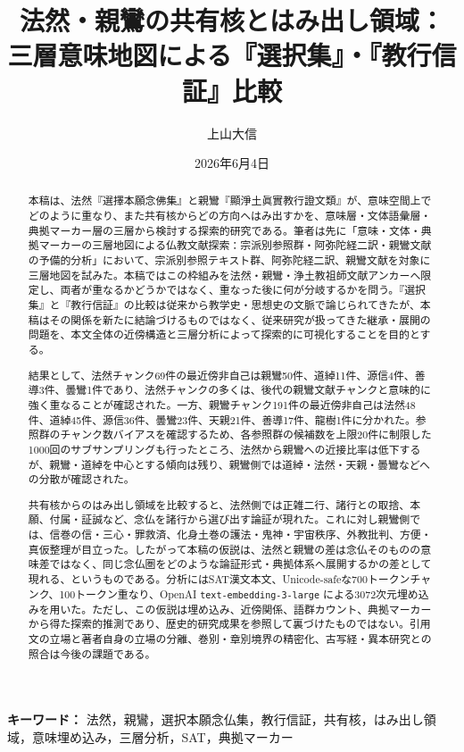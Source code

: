 \documentclass[uplatex,dvipdfmx,11pt,a4paper]{jsarticle}
\title{法然・親鸞の共有核とはみ出し領域：\\[0.35em]三層意味地図による『選択集』・『教行信証』比較}
\author{上山大信}
\date{2026年6月4日}
\begin{document}
\maketitle

\begin{abstract}
本稿は、法然『選擇本願念佛集』と親鸞『顯淨土眞實教行證文類』が、意味空間上でどのように重なり、また共有核からどの方向へはみ出すかを、意味層・文体語彙層・典拠マーカー層の三層から検討する探索的研究である。筆者は先に「意味・文体・典拠マーカーの三層地図による仏教文献探索：宗派別参照群・阿弥陀経二訳・親鸞文献の予備的分析」において、宗派別参照テキスト群、阿弥陀経二訳、親鸞文献を対象に三層地図を試みた\cite{ueyama2026three-layer-map}。本稿ではこの枠組みを法然・親鸞・浄土教祖師文献アンカーへ限定し、両者が重なるかどうかではなく、重なった後に何が分岐するかを問う。『選択集』と『教行信証』の比較は従来から教学史・思想史の文脈で論じられてきたが、本稿はその関係を新たに結論づけるものではなく、従来研究が扱ってきた継承・展開の問題を、本文全体の近傍構造と三層分析によって探索的に可視化することを目的とする。

結果として、法然チャンク69件の最近傍非自己は親鸞50件、道綽11件、源信4件、善導3件、曇鸞1件であり、法然チャンクの多くは、後代の親鸞文献チャンクと意味的に強く重なることが確認された。一方、親鸞チャンク191件の最近傍非自己は法然48件、道綽45件、源信36件、曇鸞23件、天親21件、善導17件、龍樹1件に分かれた。参照群のチャンク数バイアスを確認するため、各参照群の候補数を上限20件に制限した1000回のサブサンプリングも行ったところ、法然から親鸞への近接比率は低下するが、親鸞・道綽を中心とする傾向は残り、親鸞側では道綽・法然・天親・曇鸞などへの分散が確認された。

共有核からのはみ出し領域を比較すると、法然側では正雑二行、諸行との取捨、本願、付属・証誠など、念仏を諸行から選び出す論証が現れた。これに対し親鸞側では、信巻の信・三心・罪救済、化身土巻の護法・鬼神・宇宙秩序、外教批判、方便・真仮整理が目立った。したがって本稿の仮説は、法然と親鸞の差は念仏そのものの意味差ではなく、同じ念仏圏をどのような論証形式・典拠体系へ展開するかの差として現れる、というものである。分析にはSAT漢文本文、Unicode-safeな700トークンチャンク、100トークン重なり、OpenAI \texttt{text-embedding-3-large} による3072次元埋め込みを用いた。ただし、この仮説は埋め込み、近傍関係、語群カウント、典拠マーカーから得た探索的推測であり、歴史的研究成果を参照して裏づけたものではない。引用文の立場と著者自身の立場の分離、巻別・章別境界の精密化、古写経・異本研究との照合は今後の課題である。
\end{abstract}

\noindent\textbf{キーワード：} 法然，親鸞，選択本願念仏集，教行信証，共有核，はみ出し領域，意味埋め込み，三層分析，SAT，典拠マーカー
\end{document}
